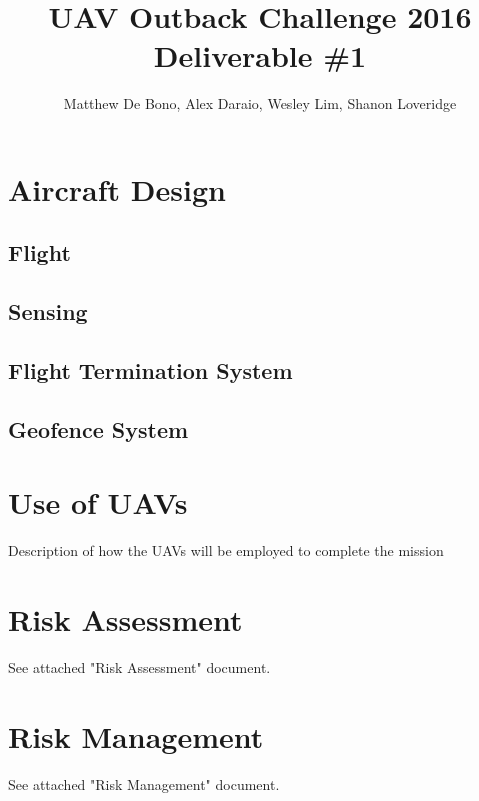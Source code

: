 \documentclass[]{article}
\title{UAV Outback Challenge 2016\\ \large Deliverable \#1\\}
\author{
	Matthew De Bono,
	Alex Daraio,
	Wesley Lim,
	Shanon Loveridge}
\begin{document}
\maketitle

\section{Aircraft Design}
\subsection{Flight}


\subsection{Sensing}


\subsection{Flight Termination System}


\subsection{Geofence System}


\section{Use of UAVs}
Description of how the UAVs will be employed to complete the mission

\section{Risk Assessment}
See attached "Risk Assessment" document.

\section{Risk Management}
See attached "Risk Management" document.
\end{document}
